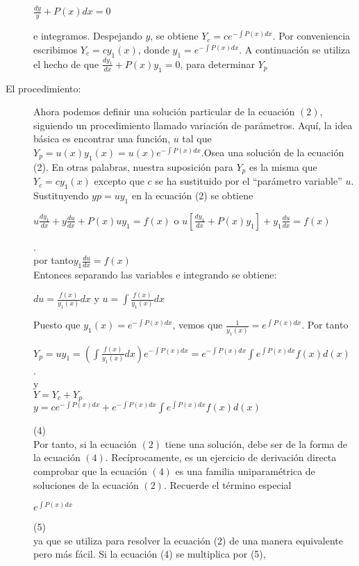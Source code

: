 \documentclass{article}
\begin{document}
\begin{description}
\begin{center}
    $\frac{dy}{y} + P(x)dx = 0$
\end{center}
e integramos. Despejando $y$, se obtiene $Y_c = ce^{- \int P(x)dx}$. Por conveniencia escribimos 
$Y_c = cy_1(x)$, donde $y_1= e^{- \int P(x)dx}$. A continuación se utiliza el hecho de que $\frac{dy_1}{dx}+ P(x)y_1= 0$, para determinar $Y_p$
\item[El procedimiento:]Ahora podemos definir una solución particular de la ecuación $(2)$, siguiendo un procedimiento llamado variación de parámetros. Aquí, la idea básica es encontrar una función, $u$ tal que $Y_p = u(x)y_1(x) = u(x)e^{- \int P(x)dx}$.Osea una solución de la ecuación (2).  En otras palabras, nuestra suposición para $Y_p$ es la misma que $Y_c =cy_1(x)$ excepto que $c$ se ha sustituido por el “parámetro variable” $u$. Sustituyendo $yp =uy_1$ en la ecuación (2) se obtiene
\begin{center}
    $u \frac{dy_1}{dx} + y \frac{du}{dx} + P(x)uy_1 = f(x)$ o $u[\frac{dy_1}{dx} + P(x)y_1] + y_1\frac{du}{dx} = f(x)$
\end{center}.\\
por tanto\tab $y_1\frac{du}{dx} = f(x)$\\\break
Entonces separando las variables e integrando se obtiene:
\begin{center}
    $du = \frac{f(x)}{y_1(x)}dx$  y  $u = \int \frac{f(x)}{y_1(x)}dx$
\end{center}
Puesto que $y_1(x) =  e^{- \int P(x)dx}$, vemos que $\frac{1}{y_1(x)} =  e^{\int P(x)dx}$. Por tanto
\begin{center}
    $Y_p = uy_1 = (\int \frac{f(x)}{y_1(x)}dx) e^{- \int P(x)dx} =  e^{- \int P(x)dx} \int e^{\int P(x)dx}f(x) d(x)$\\.\\y\\$Y = Y_c + Y_p$\\$y =  ce^{- \int P(x)dx} + e^{- \int P(x)dx}\int e^{\int P(x)dx}f(x) d(x)$
\end{center}\tab(4)\\
Por tanto, si la ecuación $(2)$ tiene una solución, debe ser de la forma de la ecuación $(4)$. Recíprocamente, es un ejercicio de derivación directa comprobar que la ecuación $(4)$ es una familia uniparamétrica de soluciones de la ecuación $(2)$. Recuerde el término especial
\begin{center}
    $e^{\int P(x)dx}$
\end{center}\tab(5)\\
ya que se utiliza para resolver la ecuación (2) de una manera equivalente pero más fácil. Si la ecuación (4) se multiplica por (5),


\end{description}
\end{document}
